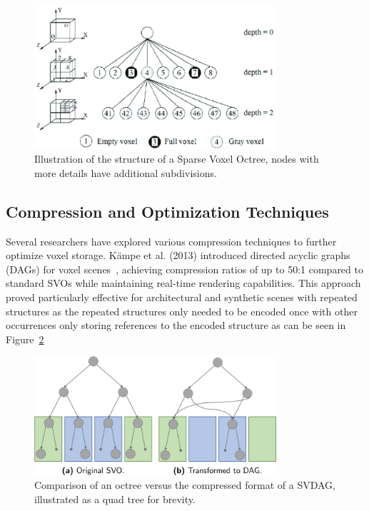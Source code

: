 \begin{figure}[thp]
    \begin{center}
        \includegraphics[width=0.8\textwidth]{figures/svo.png}
    \end{center}
    \caption{Illustration of the structure of a Sparse Voxel Octree, nodes with more details have additional
        subdivisions.~\protect\cite{truong2014octree}}
    \label{fig:evso}
\end{figure}

\subsection{Compression and Optimization Techniques}
Several researchers have explored various compression techniques to further optimize voxel storage. Kämpe et al. (2013)
introduced directed acyclic graphs (DAGs) for voxel scenes~\cite{kampe2013high}, achieving compression ratios of up to
50:1 compared to standard SVOs while maintaining real-time rendering capabilities. This approach proved particularly
effective for architectural and synthetic scenes with repeated structures as the repeated structures only needed to be
encoded once with other occurrences only storing references to the encoded structure as can be seen in
Figure~\ref{fig:svdag}

\begin{figure}[thp]
    \begin{center}
        \includegraphics[width=0.8\textwidth]{figures/svdag.png}
    \end{center}
    \caption{Comparison of an octree versus the compressed format of a SVDAG, illustrated as a quad tree for brevity.
        \protect\cite{dolonius2018sparse}}
    \label{fig:svdag}
\end{figure}

